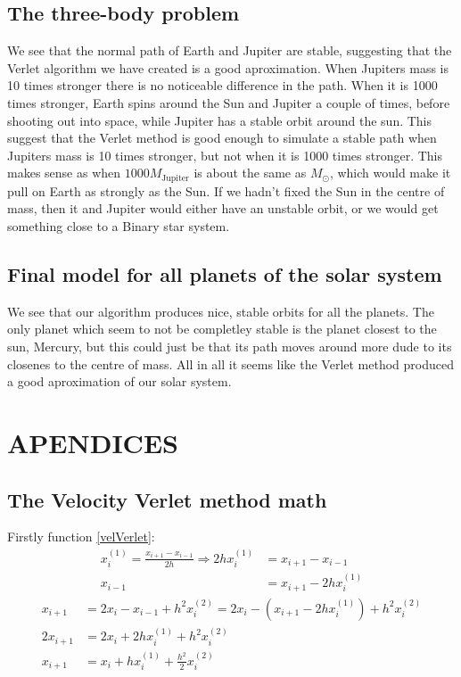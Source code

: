 \documentclass[a4paper]{article}
\begin{document}
\subsection{The three-body problem}
We see that the normal path of Earth and Jupiter are stable, suggesting that the Verlet algorithm we have created is a good aproximation. When Jupiters mass is 10 times stronger there is no noticeable difference in the path. When it is 1000 times stronger, Earth spins around the Sun and Jupiter a couple of times, before shooting out into space, while Jupiter has a stable orbit around the sun. This suggest that the Verlet method is good enough to simulate a stable path when Jupiters mass is 10 times stronger, but not when it is 1000 times stronger. This makes sense as when $1000M_{\text{Jupiter}}$ is about the same as $M_{\odot}$, which would make it pull on Earth as strongly as the Sun. If we hadn't fixed the Sun in the centre of mass, then it and Jupiter would either have an unstable orbit, or we would get something close to a Binary star system.

\subsection{Final model for all planets of the solar system}
We see that our algorithm produces nice, stable orbits for all the planets. The only planet which seem to not be completley stable is the planet closest to the sun, Mercury, but this could just be that its path moves around more dude to its closenes to the centre of mass. All in all it seems like the Verlet method produced a good aproximation of our solar system.

\section{APENDICES}

\subsection{The Velocity Verlet method math}\label{vVerlet_math}

Firstly function \ref{velVerlet}:
\begin{align}
x_i^{(1)} = \frac{x_{i+1} - x_{i-1}}{2h} \Rightarrow 2hx_i^{(1)} &= x_{i+1} - x_{i-1} \\
x_{i-1} &= x_{i+1} - 2hx_i^{(1)}
\end{align}
\begin{align}
x_{i+1} &= 2x_i - x_{i-1} + h^2 x_i^{(2)} = 2x_i - \left( x_{i+1} - 2hx_i^{(1)} \right)  + h^2 x_i^{(2)} \\
2 x_{i+1} &= 2x_i + 2hx_i^{(1)} + h^2 x_i^{(2)} \\
x_{i+1} &= x_i + hx_i^{(1)} + \frac{h^2}{2} x_i^{(2)} 
\end{align}
\end{document}
